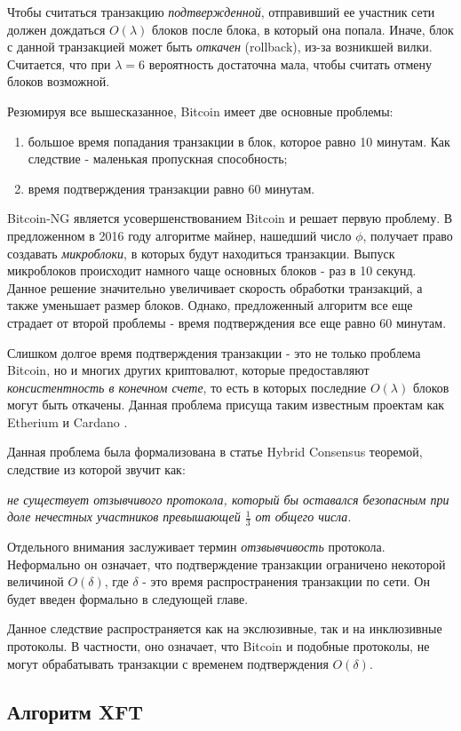 Чтобы считаться транзакцию \textit{подтвержденной}, отправивший ее участник сети должен дождаться $O(\lambda)$  блоков после блока, в который она попала. Иначе, блок с данной транзакцией может быть \textit{откачен} (rollback), из-за возникшей вилки. Считается, что при $\lambda=6$ вероятность достаточна мала, чтобы считать отмену блоков возможной.\vspace{10pt}

Резюмируя все вышесказанное, Bitcoin имеет две основные проблемы:
\begin{enumerate}
\item большое время попадания транзакции в блок, которое равно 10 минутам. Как следствие - маленькая пропускная способность;
\item время подтверждения транзакции равно 60 минутам.
\end{enumerate} \vspace{10pt}

Bitcoin-NG \cite{bitcoin-ng} является усовершенствованием Bitcoin и решает первую проблему. В предложенном в 2016 году алгоритме майнер, нашедший число $\phi$,  получает право создавать \textit{микроблоки}, в которых будут находиться транзакции. Выпуск микроблоков происходит намного чаще основных блоков - раз в 10 секунд. Данное решение значительно увеличивает скорость обработки транзакций, а также уменьшает размер блоков.
Однако, предложенный алгоритм все еще страдает от второй проблемы - время подтверждения все еще равно 60 минутам.

Слишком долгое время подтверждения транзакции - это не только проблема Bitcoin, но и многих других криптовалют, которые предоставляют \textit{консистентность в конечном счете}, то есть в которых последние $O(\lambda)$ блоков могут быть откачены. Данная проблема присуща таким известным проектам как Etherium\cite{buterin2014ethereum} и Cardano \cite{cardano}.

Данная проблема была формализована в статье Hybrid Consensus \cite{hybrid-consensus} теоремой, следствие из которой звучит как: 
\par \textit{не существует отзывчивого протокола, который бы оставался безопасным при доле нечестных участников превышающей $\frac{1}{3}$ от общего числа}.

Отдельного внимания заслуживает термин \textit{отзвывчивость} протокола. Неформально он означает, что подтверждение транзакции ограничено некоторой величиной $O(\delta)$, где $\delta$ - это время распространения транзакции по сети. Он будет введен формально в следующей главе.
 
Данное следствие распространяется как на экслюзивные, так и на инклюзивные протоколы. 
В частности, оно означает, что Bitcoin и подобные протоколы, не могут обрабатывать транзакции с временем подтверждения $O(\delta)$.

\subsection{Алгоритм XFT}
\finishrelatedwork
